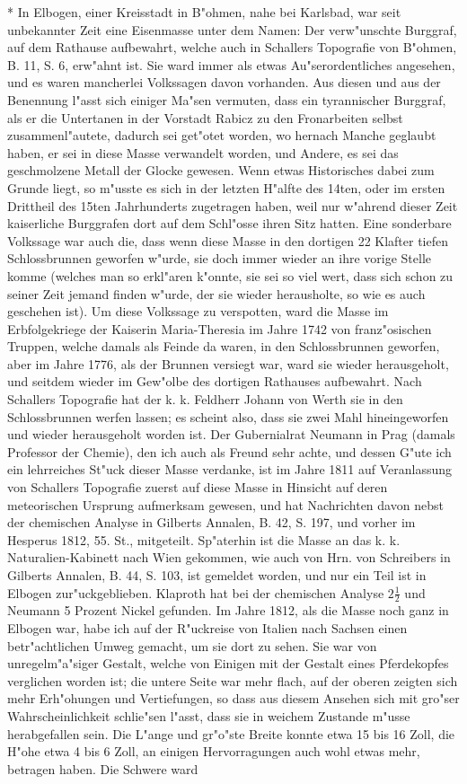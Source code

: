 \documentclass[a4paper, 11pt, oneside, polutonikogreek, german]{article}
\begin{document}
* In Elbogen, einer Kreisstadt in B"ohmen, nahe bei Karlsbad, war seit unbekannter Zeit eine Eisenmasse unter dem Namen: Der verw"unschte Burggraf, auf dem Rathause aufbewahrt, welche auch in Schallers Topografie von B"ohmen, B. 11, S. 6, erw"ahnt ist. Sie ward immer als etwas Au"serordentliches angesehen, und es waren mancherlei Volkssagen davon vorhanden. Aus diesen und aus der Benennung l"asst sich einiger Ma"sen vermuten, dass ein tyrannischer Burggraf, als er die Untertanen in der Vorstadt Rabicz zu den Fronarbeiten selbst zusammenl"autete, dadurch sei get"otet worden, wo hernach Manche geglaubt haben, er sei in diese Masse verwandelt worden, und Andere, es sei das geschmolzene Metall der Glocke gewesen. Wenn etwas Historisches dabei zum Grunde liegt, so m"usste es sich in der letzten H"alfte des 14ten, oder im ersten Drittheil des 15ten Jahrhunderts zugetragen haben, weil nur w"ahrend dieser Zeit kaiserliche Burggrafen dort auf dem Schl"osse ihren Sitz hatten. Eine sonderbare Volkssage war auch die, dass wenn diese Masse in den dortigen 22 Klafter tiefen Schlossbrunnen geworfen w"urde, sie doch immer wieder an ihre vorige Stelle komme (welches man so erkl"aren k"onnte, sie sei so viel wert, dass sich schon zu seiner Zeit jemand finden w"urde, der sie wieder herausholte, so wie es auch geschehen ist). Um diese Volkssage zu verspotten, ward die Masse im Erbfolgekriege der Kaiserin Maria-Theresia im Jahre 1742 von franz"osischen Truppen, welche damals als Feinde da waren, in den Schlossbrunnen geworfen, aber im Jahre 1776, als der Brunnen versiegt war, ward sie wieder herausgeholt, und seitdem wieder im Gew"olbe des dortigen Rathauses aufbewahrt. Nach Schallers Topografie hat der k. k. Feldherr Johann von Werth sie in den Schlossbrunnen werfen lassen; es scheint also, dass sie zwei Mahl hineingeworfen und wieder herausgeholt worden ist. Der Gubernialrat Neumann in Prag (damals Professor der Chemie), den ich auch als Freund sehr achte, und dessen G"ute ich ein lehrreiches St"uck dieser Masse verdanke, ist im Jahre 1811 auf Veranlassung von Schallers Topografie zuerst auf diese Masse in Hinsicht auf deren meteorischen Ursprung aufmerksam gewesen, und hat Nachrichten davon nebst der chemischen Analyse in Gilberts Annalen, B. 42, S. 197, und vorher im Hesperus 1812, 55. St., mitgeteilt. Sp"aterhin ist die Masse an das k. k. Naturalien-Kabinett nach Wien gekommen, wie auch von Hrn. von Schreibers in Gilberts Annalen, B. 44, S. 103, ist gemeldet worden, und nur ein Teil ist in Elbogen zur"uckgeblieben. Klaproth hat bei der chemischen Analyse $\mathfrak{2\frac{1}{2}}$ und Neumann 5 Prozent Nickel gefunden. Im Jahre 1812, als die Masse noch ganz in Elbogen war, habe ich auf der R"uckreise von Italien nach Sachsen einen betr"achtlichen Umweg gemacht, um sie dort zu sehen. Sie war von unregelm"a"siger Gestalt, welche von Einigen mit der Gestalt eines Pferdekopfes verglichen worden ist; die untere Seite war mehr flach, auf der oberen zeigten sich mehr Erh"ohungen und Vertiefungen, so dass aus diesem Ansehen sich mit gro"ser Wahrscheinlichkeit schlie"sen l"asst, dass sie in weichem Zustande m"usse herabgefallen sein. Die L"ange und gr"o"ste Breite konnte etwa 15 bis 16 Zoll, die H"ohe etwa 4 bis 6 Zoll, an einigen Hervorragungen auch wohl etwas mehr, betragen haben. Die Schwere ward 
\end{document}
